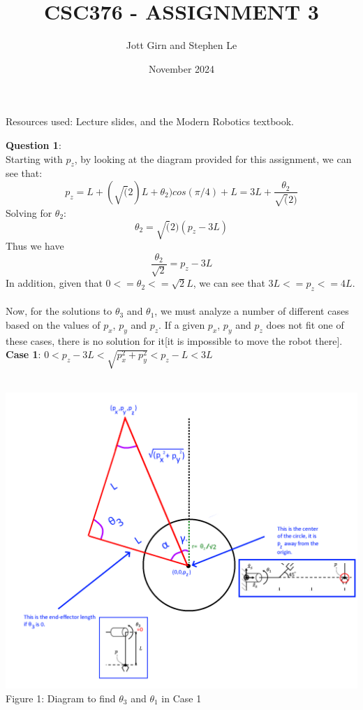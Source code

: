 \documentclass{article}
\title{CSC376 - ASSIGNMENT 3}
\author{Jott Girn and Stephen Le}
\date{November 2024}
\begin{document}
 \maketitle 
 \begin{center}
     Resources used: Lecture slides, and the Modern Robotics textbook.
     
 \end{center}
 \textbf{Question 1}:\\

Starting with $p_z$, by looking at the diagram provided for this assignment, we can see that:
$$p_z = L + (\sqrt(2)L+\theta_2)cos(\pi/4) + L = 3L + \frac{\theta_2}{\sqrt(2)}$$
Solving for $\theta_2$:
$$\theta_2 = \sqrt(2)(p_z - 3L)$$
Thus we have $$\frac{\theta_2}{\sqrt{2}} = p_z - 3L $$ 
In addition, given that $0<=\theta_2<=\sqrt{2}L$, we can see that $3L<=p_z<=4L$.
\\
\\
Now, for the solutions to $\theta_3$ and $\theta_1$, we must analyze a number of different cases based on the values of $p_x$, $p_y$ and $p_z$. If a given $p_x$, $p_y$ and $p_z$ does not fit one of these cases, there is no solution for it[it is impossible to move the robot there].
\newpage
\textbf{Case 1}: $0 < p_z - 3L < \sqrt{p_x^2 + p_y^2} < p_z - L < 3L$
\\
\\
\begin{center}
            \includegraphics[scale=0.3]{diagram_q1.png}
            Figure 1: Diagram to find $\theta_3$ and $\theta_1$ in Case 1
 \end{center}
\end{document}
